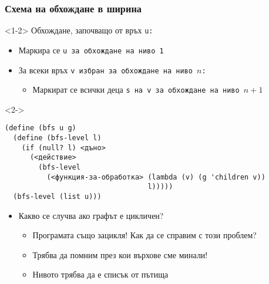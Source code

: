 \documentclass{beamer}
\begin{document}
\begin{frame}[fragile]
  \frametitle{Схема на обхождане в ширина}
  
  \begin{onlyenv}<1-2>
    Обхождане, започващо от връх \tt u:
    \begin{itemize}
    \item Маркира се \tt u за обхождане на ниво 1
    \item За всеки връх \tt v избран за обхождане на ниво $n$:
      \begin{itemize}
      \item Маркират се всички деца \tt s на \tt v за обхождане на
        ниво $n+1$
      \end{itemize}
    \end{itemize}
  \end{onlyenv}
  \begin{visibleenv}<2->
\begin{verbatim}
(define (bfs u g)
  (define (bfs-level l)
    (if (null? l) <дъно>
      (<действиe>
        (bfs-level
          (<функция-за-обработка> (lambda (v) (g 'children v))
                                  l)))))
  (bfs-level (list u)))
\end{verbatim}
  \end{visibleenv}
  \begin{itemize}[<+(3)->]
  \item \alert{Какво се случва ако графът е цикличен?}
    \begin{itemize}
    \item Програмата също зацикля! Как да се справим с този проблем?
    \item Трябва да помним през кои върхове сме минали!
    \item Нивото трябва да е \alert{списък от пътища}
    \end{itemize}
  \end{itemize}
\end{frame}
\end{document}
